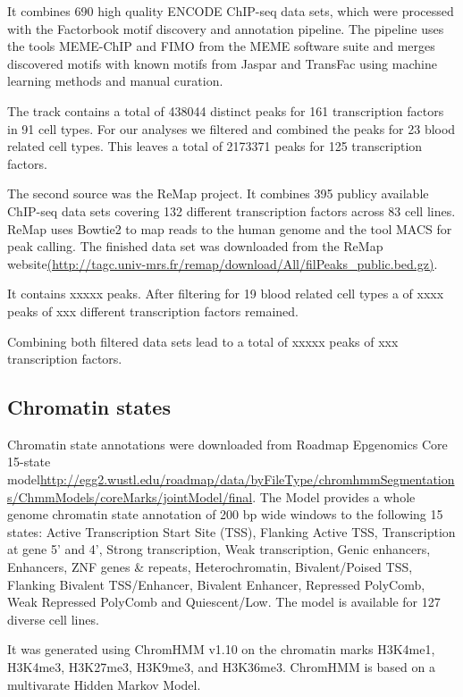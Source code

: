 \documentclass[a4paper,12pt]{article}
\begin{document}
It combines 690 high quality ENCODE ChIP-seq data sets, which were processed with the Factorbook motif discovery and annotation pipeline\cite{10.1101/gr.139105.112}. The pipeline uses the tools MEME-ChIP\cite{10.1093/bioinformatics/btr189} and FIMO\cite{10.1093/bioinformatics/btr064} from the MEME software suite and merges discovered motifs with known motifs from Jaspar\cite{10.1093/nar/gkx1126} and TransFac\cite{10.1093/nar/gkj143} using machine learning methods and manual curation. 

The track contains a total of 438044 distinct peaks for 161 transcription factors in 91 cell types. For our analyses we filtered and combined the peaks for 23 blood related cell types. This leaves a total of 2173371 peaks for 125 transcription factors.  

The second source was the ReMap project\cite{10.1093/nar/gku1280}. It combines 395 publicy available ChIP-seq data sets covering 132 different transcription factors across 83 cell lines. ReMap uses Bowtie2\cite{} to map reads to the human genome and the tool MACS\cite{} for peak calling. The finished data set was downloaded from the ReMap website\url{(http://tagc.univ-mrs.fr/remap/download/All/filPeaks_public.bed.gz)}.

It contains xxxxx peaks. After filtering for 19 blood related cell types a of xxxx peaks of xxx different transcription factors remained. 

Combining both filtered data sets lead to a total of xxxxx peaks of xxx transcription factors.


\subsection{Chromatin states}
Chromatin state annotations were downloaded from Roadmap Epgenomics Core 15-state model\url{http://egg2.wustl.edu/roadmap/data/byFileType/chromhmmSegmentations/ChmmModels/coreMarks/jointModel/final}. The Model provides a whole genome chromatin state annotation of 200 bp wide windows to the following 15 states: Active Transcription Start Site (TSS), Flanking Active TSS, Transcription at gene 5' and 4', Strong transcription, Weak transcription, Genic enhancers, Enhancers, ZNF genes \& repeats, Heterochromatin, Bivalent/Poised TSS, Flanking Bivalent TSS/Enhancer, Bivalent Enhancer, Repressed PolyComb, Weak Repressed PolyComb and Quiescent/Low. The model is available for 127 diverse cell lines. 

It was generated using ChromHMM v1.10\cite{10.1038/nmeth.1906} on the chromatin marks H3K4me1, H3K4me3, H3K27me3, H3K9me3, and H3K36me3. ChromHMM is based on a multivarate Hidden Markov Model. 
\end{document}
